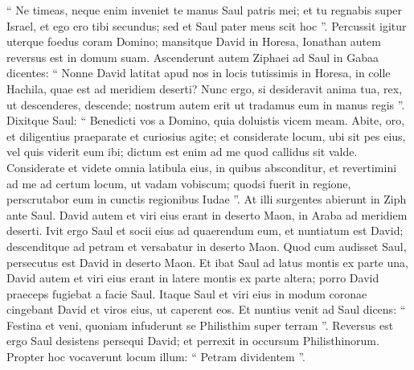 \begin{biblechapter}
\begin{biblechapter}
\begin{biblechapter}
\begin{biblechapter}
\begin{biblechapter}
\begin{biblechapter}
\begin{biblechapter}
\begin{biblechapter}
\begin{biblechapter}
\begin{biblechapter}
\begin{biblechapter}
\begin{biblechapter}
\begin{biblechapter}
\begin{biblechapter}
\begin{biblechapter}
\begin{biblechapter}
\begin{biblechapter}
\begin{biblechapter}
\begin{biblechapter}
\begin{biblechapter}
\begin{biblechapter}
\begin{biblechapter}
\begin{biblechapter}
\verse “ Ne timeas, neque enim inveniet te manus Saul patris mei; et tu regnabis super Israel, et ego ero tibi secundus; sed et Saul pater meus scit hoc ”. 
 \verse Percussit igitur uterque foedus coram Domino; mansitque David in Horesa, Ionathan autem reversus est in domum suam.
 \verse Ascenderunt autem Ziphaei ad Saul in Gabaa dicentes: “ Nonne David latitat apud nos in locis tutissimis in Horesa, in colle Hachila, quae est ad meridiem deserti? 
\verse Nunc ergo, si desideravit anima tua, rex, ut descenderes, descende; nostrum autem erit ut tradamus eum in manus regis ”. 
\verse Dixitque Saul: “ Benedicti vos a Domino, quia doluistis vicem meam. 
\verse Abite, oro, et diligentius praeparate et curiosius agite; et considerate locum, ubi sit pes eius, vel quis viderit eum ibi; dictum est enim ad me quod callidus sit valde. 
 \verse Considerate et videte omnia latibula eius, in quibus absconditur, et revertimini ad me ad certum locum, ut vadam vobiscum; quodsi fuerit in regione, perscrutabor eum in cunctis regionibus Iudae ”. 
\verse At illi surgentes abierunt in Ziph ante Saul.
 David autem et viri eius erant in deserto Maon, in Araba ad meridiem deserti. 
 \verse Ivit ergo Saul et socii eius ad quaerendum eum, et nuntiatum est David; descenditque ad petram et versabatur in deserto Maon. Quod cum audisset Saul, persecutus est David in deserto Maon. 
\verse Et ibat Saul ad latus montis ex parte una, David autem et viri eius erant in latere montis ex parte altera; porro David praeceps fugiebat a facie Saul. Itaque Saul et viri eius in modum coronae cingebant David et viros eius, ut caperent eos. 
\verse Et nuntius venit ad Saul dicens: “ Festina et veni, quoniam infuderunt se Philisthim super terram ”. 
\verse Reversus est ergo Saul desistens persequi David; et perrexit in occursum Philisthinorum. Propter hoc vocaverunt locum illum: “ Petram dividentem ”.
 

\end{biblechapter}
\end{biblechapter}
\end{biblechapter}
\end{biblechapter}
\end{biblechapter}
\end{biblechapter}
\end{biblechapter}
\end{biblechapter}
\end{biblechapter}
\end{biblechapter}
\end{biblechapter}
\end{biblechapter}
\end{biblechapter}
\end{biblechapter}
\end{biblechapter}
\end{biblechapter}
\end{biblechapter}
\end{biblechapter}
\end{biblechapter}
\end{biblechapter}
\end{biblechapter}
\end{biblechapter}
\end{biblechapter}
